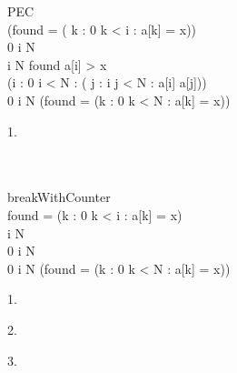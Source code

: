 \documentclass[fontsize=9p]{article}
\begin{document}
\noindent \begin{PROOF} {PEC} \\
 {(found = ( \exists k : 0 \le k < i : a[k] = x))} \\
 {0 \le i \le N} \\
 {i \ge N \vee found \vee  a[i] > x} \\
 {(\forall i : 0 \le i < N : ( \forall j : i \le j < N : a[i] \le a[j]))} \\
 {0 \le i \le N \wedge (found = (\exists k : 0 \le k < N : a[k] = x))} \\
\begin{BODY}
\item[1.]  \\
 \\ \\
\begin{PROOF}{breakWithCounter} \\
 { found = (\exists k : 0 \le k < i : a[k] = x)} \\
 {i \ge N} \\
 {0 \le i \le N} \\
 { 0 \le i \le N \wedge (found = (\exists k : 0 \le k < N : a[k] = x))} \\
\begin{BODY}
\item[1.]  \\
\item[2.]  \\
\item[3.]  \\
 \\
\end{BODY}
\end{PROOF} 
\vspace {3mm}


\end{BODY}
\end{PROOF}
\end{document}

